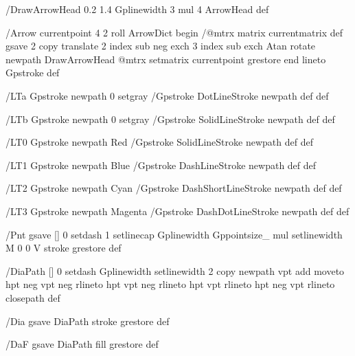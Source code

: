     
  /DrawArrowHead {0.2 1.4 Gplinewidth 3 mul 4 ArrowHead} def  
    
  /Arrow  
  {  
    currentpoint  
    4 2 roll  
    ArrowDict  
    begin  
      /@mtrx matrix currentmatrix def  
      gsave  
        2 copy translate  
        2 index sub neg exch  
        3 index sub exch Atan  
        rotate  
        newpath  
        DrawArrowHead  
        @mtrx setmatrix  
        currentpoint  
      grestore  
    end %
    lineto  
    Gpstroke  
  } def  
    
  /LTa   
  {  
    Gpstroke      
    newpath  
    0 setgray  
    /Gpstroke {DotLineStroke newpath} def  
  } def  
    
  /LTb  
  {  
    Gpstroke      
    newpath  
    0 setgray  
    /Gpstroke {SolidLineStroke newpath} def  
  } def  
    
  /LT0  
  {  
    Gpstroke      
    newpath  
    Red  
    /Gpstroke {SolidLineStroke newpath} def  
  } def  
    
  /LT1  
  {  
    Gpstroke      
    newpath  
    Blue  
    /Gpstroke {DashLineStroke newpath} def  
  } def  
    
  /LT2   
  {  
    Gpstroke  
    newpath  
    Cyan  
    /Gpstroke {DashShortLineStroke newpath} def  
  } def  
  
  /LT3   
  {  
    Gpstroke  
    newpath  
    Magenta  
    /Gpstroke {DashDotLineStroke newpath} def  
  } def  
    
  /Pnt  
  {  
    gsave   
      [] 0 setdash  
      1 setlinecap   
      Gplinewidth Gppointsize_ mul setlinewidth 
      M  
      0 0 V  
      stroke  
    grestore  
  } def  
    
  /DiaPath  
  {  
      [] 0 setdash  
      Gplinewidth setlinewidth  
      2 copy   
      newpath  
      vpt add moveto  
      hpt neg vpt neg rlineto   
      hpt vpt neg rlineto  
      hpt vpt rlineto   
      hpt neg vpt rlineto  
      closepath  
  } def  
    
  /Dia   
  {   
    gsave  
      DiaPath  
      stroke  
    grestore  
  } def  
    
  /DaF  
  {  
    gsave  
      DiaPath  
      fill  
    grestore  
  } def  
    
